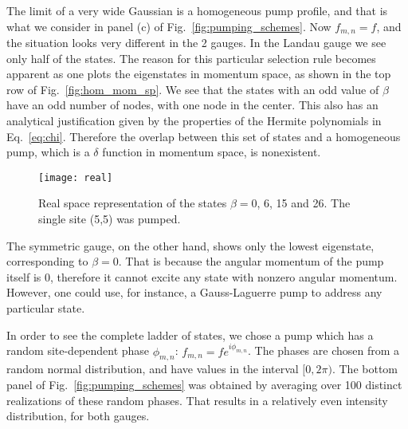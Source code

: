 \documentclass[twocolumn, 10pt, aps, superscriptaddress, floatfix, showpacs, pra, citeautoscript]{revtex4-1}
\newcommand{\co}[2]{#2}
\renewcommand{\paragraph}{\co}
\begin{document}
\paragraph{Homogeneous spectrum can be understood using a parity argument in momentum space.}
The limit of a very wide Gaussian is a homogeneous pump profile, and
that is what we consider in panel (c) of
Fig.~\ref{fig:pumping_schemes}. Now $f_{m,n} = f$, and the situation
looks very different in the 2 gauges.  In the Landau gauge we see only
half of the states. The reason for this particular selection rule
becomes apparent as one plots the eigenstates in momentum space, as
shown in the top row of Fig.~\ref{fig:hom_mom_sp}. We see that the
states with an odd value of $\beta$ have an odd number of nodes, with
one node in the center. This also has an analytical justification
given by the properties of the Hermite polynomials in
Eq.~\eqref{eq:chi}. Therefore the overlap between this set of states
and a homogeneous pump, which is a $\delta$ function in momentum
space, is nonexistent. 
%
\begin{figure}[htb]
  \centering
  \texttt{[image: real]}
  \caption{Real space representation of the states $\beta=0$, 6, 15
    and 26. The single site (5,5) was pumped.}
  \label{fig:delta_real_sp}
\end{figure}


The symmetric gauge, on the other hand, shows only the lowest
eigenstate, corresponding to $\beta=0$. That is because the angular
momentum of the pump itself is 0, therefore it cannot excite any state
with nonzero angular momentum. However, one could use, for instance, a
Gauss-Laguerre pump to address any particular state.

\paragraph{One must use a random phase in order to see all the states.}
In order to see the complete ladder of states, we chose a pump which
has a random site-dependent phase $\phi_{m,n}$:
$f_{m,n}=fe^{i\phi_{m,n}}$.  The phases are chosen from a random
normal distribution, and have values in the interval $[0,2\pi)$. The
bottom panel of Fig.~\ref{fig:pumping_schemes} was obtained by
averaging over 100 distinct realizations of these random phases. That
results in a relatively even intensity distribution, for both gauges.
\end{document}
